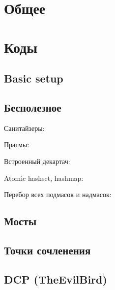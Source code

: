 \documentclass[a4paper]{article}
\begin{document}
\begin{multicols*}{2}

    \tableofcontents

    \section{Общее}
        
    
    \section{Коды}
        
        \subsection{Basic setup}
            

        \subsection{Бесполезное}
            Санитайзеры:
                
            
            Прагмы:
                
            
            Встроенный декартач:
                
                
            Atomic hashset, hashmap:
                
                
            Перебор всех подмасок и надмасок:
                
    
        \subsection{Мосты}
            
            
        \subsection{Точки сочленения}
            
            
        \subsection{DCP (TheEvilBird)}
            
        

\end{multicols*}
\end{document}
